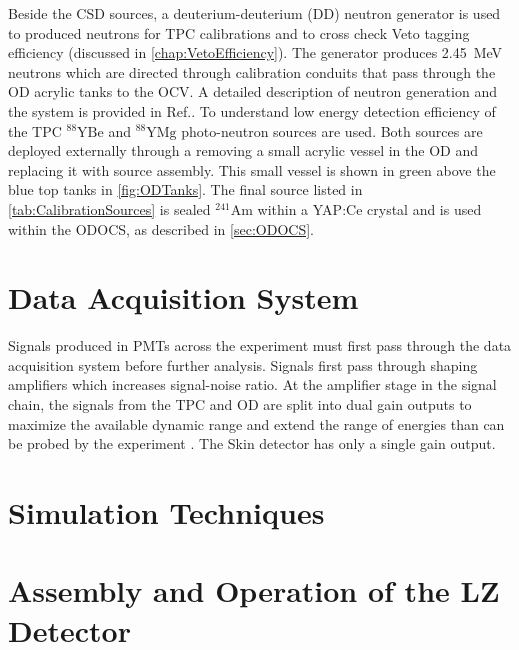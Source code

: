 Beside the CSD sources, a deuterium-deuterium (DD) neutron generator is used to produced neutrons for TPC calibrations and to cross check Veto tagging efficiency (discussed in \autoref{chap:VetoEfficiency}). The generator produces 2.45~MeV neutrons which are directed through calibration conduits that pass through the OD acrylic tanks to the OCV. A detailed description of neutron generation and the system is provided in Ref.\cite{LZ:2024bsz}. To understand low energy detection efficiency of the TPC $^{88}\text{YBe}$ and $^{88}\text{YMg}$ photo-neutron sources are used. Both sources are deployed externally through a removing a small acrylic vessel in the OD and replacing it with source assembly. This small vessel is shown in green above the blue top tanks in  \autoref{fig:ODTanks}.
The final source listed in \autoref{tab:CalibrationSources} is sealed $^{241}\text{Am}$ within a YAP:Ce crystal and is used within the ODOCS, as described in \autoref{sec:ODOCS}.

\section{Data Acquisition System}
Signals produced in PMTs across the experiment must first pass through the data acquisition system before further analysis. Signals first pass through shaping amplifiers which increases signal-noise ratio. At the amplifier stage in the signal chain, the signals from the TPC and OD are split into dual gain outputs to maximize the available dynamic range and extend the range of energies than can be probed by the experiment \cite{Druszkiewicz:2015pcl}. The Skin detector has only a single gain output.
\section{Simulation Techniques}

\section{Assembly and Operation of the LZ Detector}
